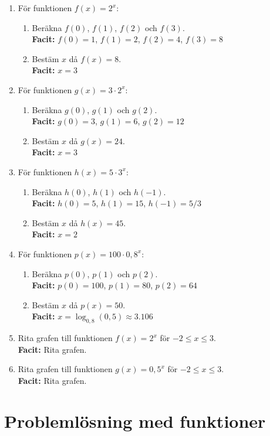 \documentclass[a4paper,11pt]{article}
\begin{document}
\begin{enumerate}[label=\textbf{\arabic*.}]
    \item För funktionen $f(x) = 2^x$:
    \begin{enumerate}[label=\alph*)]
        \item Beräkna $f(0)$, $f(1)$, $f(2)$ och $f(3)$.
        \\ \textbf{Facit:} $f(0)=1$, $f(1)=2$, $f(2)=4$, $f(3)=8$
        \item Bestäm $x$ då $f(x) = 8$.
        \\ \textbf{Facit:} $x=3$
    \end{enumerate}
    
    \item För funktionen $g(x) = 3 \cdot 2^x$:
    \begin{enumerate}[label=\alph*)]
        \item Beräkna $g(0)$, $g(1)$ och $g(2)$.
        \\ \textbf{Facit:} $g(0)=3$, $g(1)=6$, $g(2)=12$
        \item Bestäm $x$ då $g(x) = 24$.
        \\ \textbf{Facit:} $x=3$
    \end{enumerate}
    
    \item För funktionen $h(x) = 5 \cdot 3^x$:
    \begin{enumerate}[label=\alph*)]
        \item Beräkna $h(0)$, $h(1)$ och $h(-1)$.
        \\ \textbf{Facit:} $h(0)=5$, $h(1)=15$, $h(-1)=5/3$
        \item Bestäm $x$ då $h(x) = 45$.
        \\ \textbf{Facit:} $x=2$
    \end{enumerate}
    
    \item För funktionen $p(x) = 100 \cdot 0,8^x$:
    \begin{enumerate}[label=\alph*)]
        \item Beräkna $p(0)$, $p(1)$ och $p(2)$.
        \\ \textbf{Facit:} $p(0)=100$, $p(1)=80$, $p(2)=64$
        \item Bestäm $x$ då $p(x) = 50$.
        \\ \textbf{Facit:} $x=\log_{0,8}(0,5) \approx 3.106$
    \end{enumerate}
    
    \item Rita grafen till funktionen $f(x) = 2^x$ för $-2 \leq x \leq 3$.
    \\ \textbf{Facit:} Rita grafen.
    
    \item Rita grafen till funktionen $g(x) = 0,5^x$ för $-2 \leq x \leq 3$.
    \\ \textbf{Facit:} Rita grafen.
\end{enumerate}

\newpage
\section*{Problemlösning med funktioner}

\end{document}
